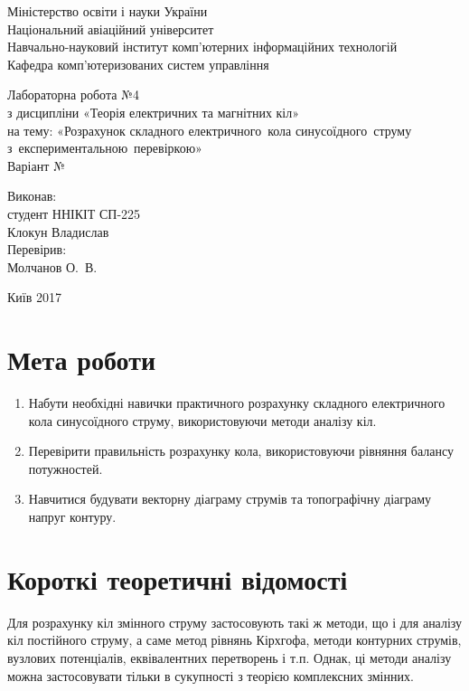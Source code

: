 \documentclass[a4paper,oneside,DIV=10,12pt]{scrartcl}
\begin{document}
	\begin{titlepage}
		\begin{center}
			Міністерство освіти і науки України\\
			Національний авіаційний університет\\
			Навчально-науковий інститут комп'ютерних інформаційних технологій\\
			Кафедра комп'ютеризованих систем управління
			
			\vspace{\fill}
				Лабораторна робота №4\\
				з дисципліни «Теорія електричних та магнітних кіл»\\
				на тему: «Розрахунок складного електричного~кола синусоїдного~струму з~експериментальною~перевіркою»\\
				Варіант №
				
			\vspace{\fill}
			
			\begin{flushright}
				Виконав:\\
				студент ННІКІТ СП-225\\
				Клокун Владислав\\
				Перевірив:\\
				Молчанов О.~В.
			\end{flushright}
			Київ 2017
		\end{center}
	\end{titlepage}
	
	\section{Мета роботи}
		\begin{enumerate}
			\item Набути необхідні навички практичного розрахунку складного електричного кола синусоїдного струму, використовуючи методи аналізу кіл.
			\item Перевірити правильність розрахунку кола, використовуючи рівняння балансу потужностей.
			\item Навчитися будувати векторну діаграму струмів та топографічну діаграму напруг контуру.
		\end{enumerate}
		
	\section{Короткі теоретичні відомості}
		Для розрахунку кіл змінного струму застосовують такі ж методи, що і для аналізу кіл постійного струму, а саме метод рівнянь Кірхгофа, методи контурних струмів, вузлових потенціалів, еквівалентних перетворень і т.п. Однак, ці методи аналізу можна застосовувати тільки в сукупності з теорією комплексних змінних.
		
\end{document}
